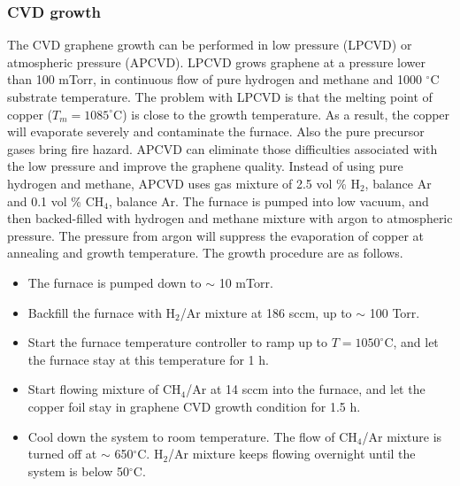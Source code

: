 \documentclass[pdflatex, sectionletters, 12pt]{pittetd}    %
\begin{document}
\subsubsection{CVD growth}

The CVD graphene growth can be performed in low pressure (LPCVD) or atmospheric pressure (APCVD). LPCVD grows graphene at a pressure lower than 100 mTorr, in continuous flow of pure hydrogen and methane and 1000 $^{\circ}$C substrate temperature. The problem with LPCVD is that the melting point of copper ($T_m = 1085^{\circ}$C) is close to the growth temperature. As a result, the copper will evaporate severely and contaminate the furnace\cite{vlassiouk2013large}. Also the pure precursor gases bring fire hazard. APCVD can eliminate those difficulties associated with the low pressure and improve the graphene quality\cite{vlassiouk2013large, dhingra2015quadratic}. Instead of using pure hydrogen and methane, APCVD uses gas mixture of 2.5 vol \% H$_2$, balance Ar and 0.1 vol \% CH$_4$, balance Ar. The furnace is pumped into low vacuum, and then backed-filled with hydrogen and methane mixture with argon to atmospheric pressure. The pressure from argon will suppress the evaporation of copper at annealing and growth temperature. The growth procedure are as follows\cite{dhingra2015quadratic}. 

\begin{itemize}
	\item The furnace is pumped down to $\sim$ 10 mTorr.
	\item Backfill the furnace with H$_2$/Ar mixture at 186 sccm, up to $\sim$ 100 Torr.
	\item Start the furnace temperature controller to ramp up to $T = 1050 ^{\circ}$C, and let the furnace stay at this temperature for 1 h.
	\item Start flowing mixture of CH$_4$/Ar at 14 sccm into the furnace, and let the copper foil stay in graphene CVD growth condition for 1.5 h.
	\item Cool down the system to room temperature. The flow of CH$_4$/Ar mixture is turned off at $\sim$ 650$^{\circ}$C. H$_2$/Ar mixture keeps flowing overnight until the system is below 50$^{\circ}$C. 
	
\end{itemize}
\end{document}

